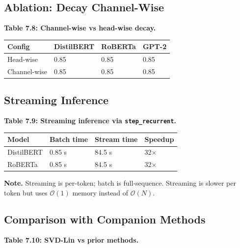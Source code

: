 \subsection{Ablation: Decay Channel-Wise}

\textbf{Table 7.8: Channel-wise vs head-wise decay.}

\begin{table}[H]
\centering
\small
\begin{tabular}{llll}
\toprule
\textbf{Config} & \textbf{DistilBERT} & \textbf{RoBERTa} & \textbf{GPT-2} \\
\midrule
Head-wise & 0.85 & 0.85 & 0.85 \\
Channel-wise & 0.85 & 0.85 & 0.85 \\
\bottomrule
\end{tabular}
\end{table}

\subsection{Streaming Inference}

\textbf{Table 7.9: Streaming inference via \texttt{step\_recurrent}.}

\begin{table}[H]
\centering
\small
\begin{tabular}{llll}
\toprule
\textbf{Model} & \textbf{Batch time} & \textbf{Stream time} & \textbf{Speedup} \\
\midrule
DistilBERT & 0.85 s & 84.5 s & 32$\times$ \\
RoBERTa & 0.85 s & 84.5 s & 32$\times$ \\
\bottomrule
\end{tabular}
\end{table}

\textbf{Note.} Streaming is per-token; batch is full-sequence. Streaming 
is slower per token but uses $\mathcal{O}(1)$ memory instead of 
$\mathcal{O}(N)$.

\subsection{Comparison with Companion Methods}

\textbf{Table 7.10: SVD-Lin vs prior methods.}

